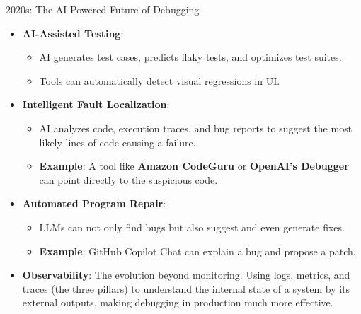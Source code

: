 \documentclass{beamer}
\begin{document}
\begin{frame}{2020s: The AI-Powered Future of Debugging}
\begin{itemize}
    \item \textbf{AI-Assisted Testing}:
    \begin{itemize}
        \item AI generates test cases, predicts flaky tests, and optimizes test suites.
        \item Tools can automatically detect visual regressions in UI.
    \end{itemize}
    \item \textbf{Intelligent Fault Localization}:
    \begin{itemize}
        \item AI analyzes code, execution traces, and bug reports to suggest the most likely lines of code causing a failure.
        \item \textbf{Example}: A tool like \textbf{Amazon CodeGuru} or \textbf{OpenAI's Debugger} can point directly to the suspicious code.
    \end{itemize}
    \item \textbf{Automated Program Repair}:
    \begin{itemize}
        \item LLMs can not only find bugs but also suggest and even generate fixes.
        \item \textbf{Example}: GitHub Copilot Chat can explain a bug and propose a patch.
    \end{itemize}
    \item \textbf{Observability}: The evolution beyond monitoring. Using logs, metrics, and traces (the three pillars) to understand the internal state of a system by its external outputs, making debugging in production much more effective.
\end{itemize}
\end{frame}
\end{document}
